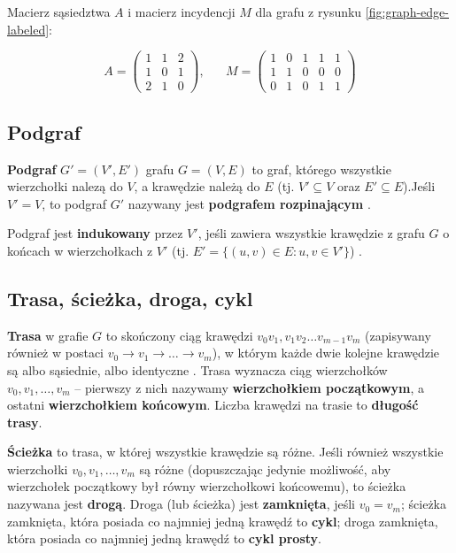 Macierz sąsiedztwa $A$ i macierz incydencji $M$ dla grafu z rysunku \ref{fig:graph-edge-labeled}:

\[A = 
 \begin{pmatrix}
  1 & 1 & 2 \\
  1 & 0 & 1 \\
  2 & 1 & 0 
 \end{pmatrix}, \hspace{20pt}
 M = 
 \begin{pmatrix}
  1 & 0 & 1 & 1 & 1 \\
  1 & 1 & 0 & 0 & 0 \\
  0 & 1 & 0 & 1 & 1 
 \end{pmatrix}
\]


\subsection*{Podgraf}
\textbf{Podgraf} $G'=(V',E')$ grafu $G=(V,E)$ to graf, którego wszystkie wierzchołki nalezą do $V$, a krawędzie należą do $E$ (tj. $V' \subseteq V$ oraz $E' \subseteq E$).Jeśli $V' = V$, to podgraf $G'$ nazywany jest \textbf{podgrafem rozpinającym} \cite[229]{banachowski}. 

Podgraf jest \textbf{indukowany} przez $V'$, jeśli zawiera wszystkie krawędzie z grafu $G$ o końcach w wierzchołkach z $V'$ (tj. $E'=\{(u,v) \in E: u,v \in V' \}$) \cite[1195]{cormen}.


\subsection*{Trasa, ścieżka, droga, cykl}

\textbf{Trasa} w grafie $G$ to skończony ciąg krawędzi $v_0v_1,v_1v_2\ldots v_{m-1}v_m$ (zapisywany również w postaci $v_0 \rightarrow v_1 \rightarrow \ldots \rightarrow v_m$), w którym każde dwie kolejne krawędzie są albo sąsiednie, albo identyczne \cite[41]{wilson}. Trasa wyznacza ciąg wierzchołków $v_0,v_1,\ldots,v_m$ -- pierwszy z nich nazywamy \textbf{wierzchołkiem początkowym}, a ostatni \textbf{wierzchołkiem końcowym}. Liczba krawędzi na trasie to \textbf{długość trasy}. 

\textbf{Ścieżka} to trasa, w której wszystkie krawędzie są różne. Jeśli również wszystkie wierzchołki $v_0,v_1,\ldots,v_m$ są różne (dopuszczając jedynie możliwość, aby wierzchołek początkowy był równy wierzchołkowi końcowemu), to ścieżka nazywana jest \textbf{drogą}. Droga (lub ścieżka) jest \textbf{zamknięta}, jeśli $v_0 = v_m$; ścieżka zamknięta, która posiada co najmniej jedną krawędź to \textbf{cykl}; droga zamknięta, która posiada co najmniej jedną krawędź to \textbf{cykl prosty}.

